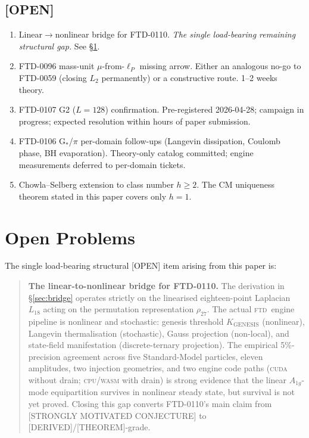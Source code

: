 \documentclass[11pt,reqno]{amsart}
\theoremstyle{plain}
\theoremstyle{definition}
\theoremstyle{remark}
\numberwithin{equation}{section}
\newcommand{\Aoneg}{A_{1g}}
\newcommand{\KGen}{K_{\!\mathrm{GENESIS}}}
\newcommand{\FTD}{\textsc{ftd}}
\begin{document}
\subsection{[OPEN]}

\begin{enumerate}
\item Linear$\to$nonlinear bridge for FTD-0110. \emph{The single
load-bearing remaining structural gap.} See \S\ref{sec:open}.
\item FTD-0096 mass-unit $\mu$-from-$\ell_P$ missing arrow.
Either an analogous no-go to FTD-0059 (closing $L_2$ permanently)
or a constructive route. 1--2 weeks theory.
\item FTD-0107 G2 ($L = 128$) confirmation. Pre-registered
2026-04-28; campaign in progress; expected resolution within hours
of paper submission.
\item FTD-0106 G$_*$/$\pi$ per-domain follow-ups (Langevin
dissipation, Coulomb phase, BH evaporation). Theory-only catalog
committed; engine measurements deferred to per-domain tickets.
\item Chowla--Selberg extension to class number $h \geq 2$. The CM
uniqueness theorem stated in this paper covers only $h = 1$.
\end{enumerate}

\section{Open Problems}
\label{sec:open}

The single load-bearing structural [OPEN] item arising from this
paper is:

\begin{quote}
\textbf{The linear-to-nonlinear bridge for FTD-0110.}
The derivation in \S\ref{sec:bridge} operates strictly on the
linearised eighteen-point Laplacian $L_{18}$ acting on the
permutation representation $\rho_{27}$. The actual \FTD\ engine
pipeline is nonlinear and stochastic: genesis threshold $\KGen$
(nonlinear), Langevin thermalisation (stochastic), Gauss projection
(non-local), and state-field manifestation (discrete-ternary
projection). The empirical 5\%-precision agreement
across five Standard-Model particles, eleven amplitudes, two
injection geometries, and two engine code paths (\textsc{cuda}
without drain; \textsc{cpu/wasm} with drain) is strong evidence
that the linear $\Aoneg$-mode equipartition survives in nonlinear
steady state, but survival is not yet proved. Closing this gap
converts FTD-0110's main claim from [STRONGLY MOTIVATED CONJECTURE]
to [DERIVED]/[THEOREM]-grade.
\end{quote}
\end{document}

